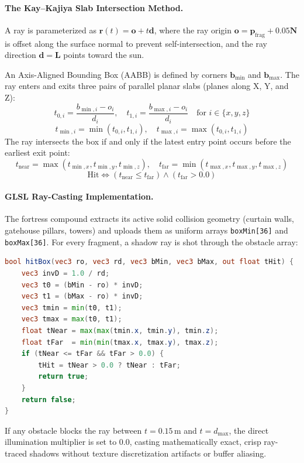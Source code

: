 \documentclass[11pt,a4paper]{article}
\begin{document}
\paragraph{The Kay--Kajiya Slab Intersection Method.}
A ray is parameterized as $\mathbf{r}(t) = \mathbf{o} + t\mathbf{d}$, where the ray origin $\mathbf{o} = \mathbf{p}_{\text{frag}} + 0.05 \mathbf{N}$ is offset along the surface normal to prevent self-intersection, and the ray direction $\mathbf{d} = \mathbf{L}$ points toward the sun.

An Axis-Aligned Bounding Box (AABB) is defined by corners $\mathbf{b}_{\min}$ and $\mathbf{b}_{\max}$. The ray enters and exits three pairs of parallel planar slabs (planes along X, Y, and Z):
\begin{equation}
  t_{0, i} = \frac{b_{\min, i} - o_i}{d_i}, \quad t_{1, i} = \frac{b_{\max, i} - o_i}{d_i} \quad \text{for } i \in \{x, y, z\}
\end{equation}
\begin{equation}
  t_{\min, i} = \min(t_{0, i}, t_{1, i}), \quad t_{\max, i} = \max(t_{0, i}, t_{1, i})
\end{equation}
The ray intersects the box if and only if the latest entry point occurs before the earliest exit point:
\begin{equation}
  t_{\text{near}} = \max(t_{\min, x}, t_{\min, y}, t_{\min, z}), \quad
  t_{\text{far}} = \min(t_{\max, x}, t_{\max, y}, t_{\max, z})
\end{equation}
\begin{equation}
  \text{Hit} \iff (t_{\text{near}} \le t_{\text{far}}) \land (t_{\text{far}} > 0.0)
\end{equation}

\paragraph{GLSL Ray-Casting Implementation.}
The fortress compound extracts its active solid collision geometry (curtain walls, gatehouse pillars, towers) and uploads them as uniform arrays \texttt{boxMin[36]} and \texttt{boxMax[36]}. For every fragment, a shadow ray is shot through the obstacle array:
\begin{lstlisting}[language=GLSL]
bool hitBox(vec3 ro, vec3 rd, vec3 bMin, vec3 bMax, out float tHit) {
    vec3 invD = 1.0 / rd;
    vec3 t0 = (bMin - ro) * invD;
    vec3 t1 = (bMax - ro) * invD;
    vec3 tmin = min(t0, t1);
    vec3 tmax = max(t0, t1);
    float tNear = max(max(tmin.x, tmin.y), tmin.z);
    float tFar  = min(min(tmax.x, tmax.y), tmax.z);
    if (tNear <= tFar && tFar > 0.0) {
        tHit = tNear > 0.0 ? tNear : tFar;
        return true;
    }
    return false;
}
\end{lstlisting}
If any obstacle blocks the ray between $t = 0.15\,\text{m}$ and $t = d_{\text{max}}$, the direct illumination multiplier is set to $0.0$, casting mathematically exact, crisp ray-traced shadows without texture discretization artifacts or buffer aliasing.
\end{document}
